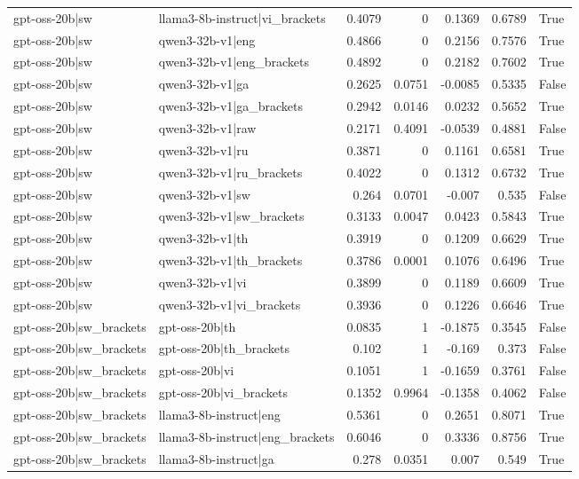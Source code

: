 \begin{table}
\begin{tabular}{l l r r r r l}
gpt-oss-20b|sw & llama3-8b-instruct|vi_brackets & 0.4079 & 0 & 0.1369 & 0.6789 & True \\
gpt-oss-20b|sw & qwen3-32b-v1|eng & 0.4866 & 0 & 0.2156 & 0.7576 & True \\
gpt-oss-20b|sw & qwen3-32b-v1|eng_brackets & 0.4892 & 0 & 0.2182 & 0.7602 & True \\
gpt-oss-20b|sw & qwen3-32b-v1|ga & 0.2625 & 0.0751 & -0.0085 & 0.5335 & False \\
gpt-oss-20b|sw & qwen3-32b-v1|ga_brackets & 0.2942 & 0.0146 & 0.0232 & 0.5652 & True \\
gpt-oss-20b|sw & qwen3-32b-v1|raw & 0.2171 & 0.4091 & -0.0539 & 0.4881 & False \\
gpt-oss-20b|sw & qwen3-32b-v1|ru & 0.3871 & 0 & 0.1161 & 0.6581 & True \\
gpt-oss-20b|sw & qwen3-32b-v1|ru_brackets & 0.4022 & 0 & 0.1312 & 0.6732 & True \\
gpt-oss-20b|sw & qwen3-32b-v1|sw & 0.264 & 0.0701 & -0.007 & 0.535 & False \\
gpt-oss-20b|sw & qwen3-32b-v1|sw_brackets & 0.3133 & 0.0047 & 0.0423 & 0.5843 & True \\
gpt-oss-20b|sw & qwen3-32b-v1|th & 0.3919 & 0 & 0.1209 & 0.6629 & True \\
gpt-oss-20b|sw & qwen3-32b-v1|th_brackets & 0.3786 & 0.0001 & 0.1076 & 0.6496 & True \\
gpt-oss-20b|sw & qwen3-32b-v1|vi & 0.3899 & 0 & 0.1189 & 0.6609 & True \\
gpt-oss-20b|sw & qwen3-32b-v1|vi_brackets & 0.3936 & 0 & 0.1226 & 0.6646 & True \\
gpt-oss-20b|sw_brackets & gpt-oss-20b|th & 0.0835 & 1 & -0.1875 & 0.3545 & False \\
gpt-oss-20b|sw_brackets & gpt-oss-20b|th_brackets & 0.102 & 1 & -0.169 & 0.373 & False \\
gpt-oss-20b|sw_brackets & gpt-oss-20b|vi & 0.1051 & 1 & -0.1659 & 0.3761 & False \\
gpt-oss-20b|sw_brackets & gpt-oss-20b|vi_brackets & 0.1352 & 0.9964 & -0.1358 & 0.4062 & False \\
gpt-oss-20b|sw_brackets & llama3-8b-instruct|eng & 0.5361 & 0 & 0.2651 & 0.8071 & True \\
gpt-oss-20b|sw_brackets & llama3-8b-instruct|eng_brackets & 0.6046 & 0 & 0.3336 & 0.8756 & True \\
gpt-oss-20b|sw_brackets & llama3-8b-instruct|ga & 0.278 & 0.0351 & 0.007 & 0.549 & True \\

\end{tabular}
\end{table}
